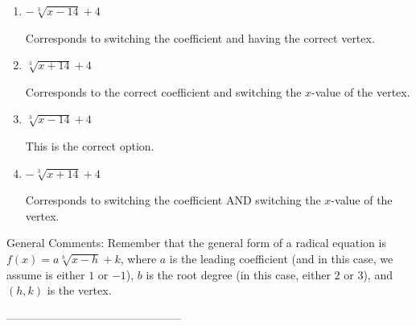 \documentclass{article}[10pt]
\begin{document}
\begin{enumerate}[label=\Alph*.] 
\item $ - \sqrt[3]{x - 14} + 4 $ 

 Corresponds to switching the coefficient and having the correct vertex. 
\item $ \sqrt[3]{x + 14} + 4 $ 

 Corresponds to the correct coefficient and switching the $x$-value of the vertex. 
\item $ \sqrt[3]{x - 14} + 4 $ 

 This is the correct option. 
\item $ - \sqrt[3]{x + 14} + 4 $ 

 Corresponds to switching the coefficient AND switching the $x$-value of the vertex. 
\end{enumerate} 
 
General Comments: Remember that the general form of a radical equation is $ f(x) = a \sqrt[b]{x - h} + k$, where $a$ is the leading coefficient (and in this case, we assume is either $1$ or $-1$), $b$ is the root degree (in this case, either $2$ or $3$), and $(h, k)$ is the vertex.

-----------------------------------------------
\end{document}
